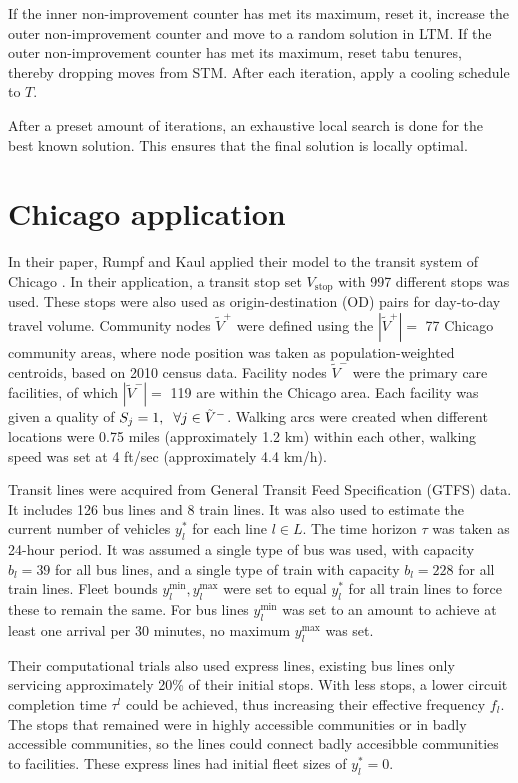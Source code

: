 If the inner non-improvement counter has met its maximum, reset it, increase the outer non-improvement counter and move to a random solution in LTM. If the outer non-improvement counter has met its maximum, reset tabu tenures, thereby dropping moves from STM. After each iteration, apply a cooling schedule to $T$.

After a preset amount of iterations, an exhaustive local search is done for the best known solution. This ensures that the final solution is locally optimal.

\section{Chicago application}
In their paper, Rumpf and Kaul applied their model to the transit system of Chicago \cite{rumpf}. In their application, a transit stop set $V_{\text{stop}}$ with 997 different stops was used. These stops were also used as origin-destination (OD) pairs for day-to-day travel volume. Community nodes $\tilde V^+$ were defined using the $|\tilde V^+| =$ 77 Chicago community areas, where node position was taken as population-weighted centroids, based on 2010 census data. Facility nodes $\tilde V^-$ were the primary care facilities, of which $|\tilde V^-|=$ 119 are within the Chicago area. Each facility was given a quality of $S_j = 1,\hspace{2mm} \forall j\in  \tilde V^-$. Walking arcs were created when different locations were 0.75 miles (approximately 1.2 km) within each other, walking speed was set at 4 ft/sec (approximately 4.4 km/h).

Transit lines were acquired from General Transit Feed Specification (GTFS) data. It includes 126 bus lines and 8 train lines. It was also used to estimate the current number of vehicles $y^*_l$ for each line $l\in L$. The time horizon $\tau$ was taken as 24-hour period. It was assumed a single type of bus was used, with capacity $b_l = 39$ for all bus lines, and a single type of train with capacity $b_l = 228$ for all train lines. Fleet bounds $y^\text{min}_l, y^\text{max}_l$ were set to equal $y^*_l$ for all train lines to force these to remain the same. For bus lines $y^\text{min}_l$ was set to an amount to achieve at least one arrival per 30 minutes, no maximum $y^\text{max}_l$ was set.

Their computational trials also used express lines, existing bus lines only servicing approximately 20\% of their initial stops. With less stops, a lower circuit completion time $\tau^l$ could be achieved, thus increasing their effective frequency $f_l$. The stops that remained were in highly accessible communities or in badly accessible communities, so the lines could connect badly accesibble communities to facilities. These express lines had initial fleet sizes of $y^*_l = 0$.

